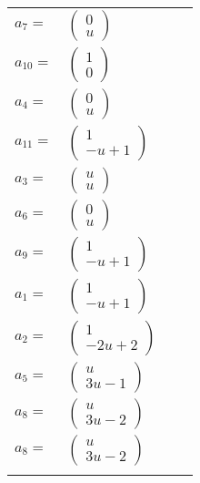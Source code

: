 \documentclass[1p]{elsarticle_modified}
\theoremstyle{definition}
\begin{document}
\begin{tabular}{m{7pt} m{180pt} m{7pt} m{180pt} }
\flushright $a_{7}=$&$\begin{pmatrix}0\\u\end{pmatrix}$ \\
\flushright $a_{10}=$&$\begin{pmatrix}1\\0\end{pmatrix}$ \\
\flushright $a_{4}=$&$\begin{pmatrix}0\\u\end{pmatrix}$ \\
\flushright $a_{11}=$&$\begin{pmatrix}1\\- u+1\end{pmatrix}$ \\
\flushright $a_{3}=$&$\begin{pmatrix}u\\u\end{pmatrix}$ \\
\flushright $a_{6}=$&$\begin{pmatrix}0\\u\end{pmatrix}$ \\
\flushright $a_{9}=$&$\begin{pmatrix}1\\- u+1\end{pmatrix}$ \\
\flushright $a_{1}=$&$\begin{pmatrix}1\\- u+1\end{pmatrix}$ \\
\flushright $a_{2}=$&$\begin{pmatrix}1\\-2 u+2\end{pmatrix}$ \\
\flushright $a_{5}=$&$\begin{pmatrix}u\\3 u-1\end{pmatrix}$ \\
\flushright $a_{8}=$&$\begin{pmatrix}u\\3 u-2\end{pmatrix}$\\ \flushright $a_{8}=$&$\begin{pmatrix}u\\3 u-2\end{pmatrix}$\\&\end{tabular}
\end{document}

